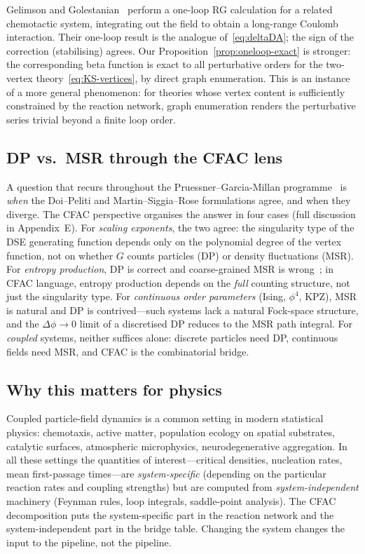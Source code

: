 \documentclass[11pt,a4paper]{article}
\theoremstyle{plain}
\begin{document}
Gelimson and Golestanian~\cite{GelimsonGolestanian2015} perform a
one-loop RG calculation for a related chemotactic system,
integrating out the field to obtain a long-range Coulomb
interaction.  Their one-loop result is the analogue
of~\eqref{eq:deltaDA}; the sign of the correction
(stabilising) agrees.  Our
Proposition~\ref{prop:oneloop-exact} is stronger: the
corresponding beta function is exact to all perturbative orders
for the two-vertex theory~\eqref{eq:KS-vertices}, by direct
graph enumeration.  This is an instance of a more general
phenomenon: for theories whose vertex content is sufficiently
constrained by the reaction network, graph enumeration renders
the perturbative series trivial beyond a finite loop order.

\subsection{DP vs.\ MSR through the CFAC lens}

A question that recurs throughout the Pruessner--Garcia-Millan
programme~\cite{PruessnerGarciaMillan2025,Bothe2023} is
\emph{when} the Doi--Peliti and Martin--Siggia--Rose formulations
agree, and when they diverge.  The CFAC perspective organises the
answer in four cases (full discussion in Appendix~E).  For
\emph{scaling exponents}, the two agree: the singularity type of
the DSE generating function depends only on the polynomial degree
of the vertex function, not on whether $G$ counts particles
(DP) or density fluctuations (MSR).  For \emph{entropy production},
DP is correct and coarse-grained MSR is
wrong~\cite{PruessnerGarciaMillan2025}; in CFAC language, entropy
production depends on the \emph{full} counting structure, not
just the singularity type.  For \emph{continuous order parameters}
(Ising, $\phi^4$, KPZ), MSR is natural and DP is
contrived---such systems lack a natural Fock-space structure, and
the $\Delta\phi \to 0$ limit of a discretised DP reduces to the
MSR path integral.  For \emph{coupled} systems, neither suffices
alone: discrete particles need DP, continuous fields need MSR,
and CFAC is the combinatorial bridge.

\subsection{Why this matters for physics}

Coupled particle-field dynamics is a common setting in modern
statistical physics: chemotaxis, active matter, population
ecology on spatial substrates, catalytic surfaces, atmospheric
microphysics, neurodegenerative aggregation.  In all these
settings the quantities of interest---critical densities,
nucleation rates, mean first-passage times---are
\emph{system-specific} (depending on the particular reaction
rates and coupling strengths) but are computed from
\emph{system-independent} machinery (Feynman rules, loop
integrals, saddle-point analysis).  The CFAC decomposition puts
the system-specific part in the reaction network and the
system-independent part in the bridge table.  Changing the
system changes the input to the pipeline, not the pipeline.
\end{document}
